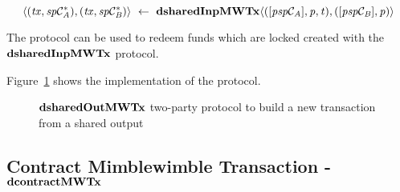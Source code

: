 \[ \langle (\mathit{tx}, \mathit{sp}\mathcal{C}_{\mathit{A}}^*), (\mathit{tx}, \mathit{sp}\mathcal{C}_{\mathit{B}}^*) \rangle ~\leftarrow~ \mathbf{dsharedInpMWTx} \langle([\mathit{psp}\mathcal{C}_{\mathit{A}}],\mathit{p},\mathit{t}), ([\mathit{psp}\mathcal{C}_{\mathit{B}}],\mathit{p}) \rangle \]

The protocol can be used to redeem funds which are locked created with the \\ $\mathbf{dsharedInpMWTx}$ protocol.

Figure~\cref{fig:d-shared-inp-mw-tx} shows the implementation of the protocol.

\begin{figure}
    \begin{center}
    \end{center}
    \caption{$\mathbf{dsharedOutMWTx}$ two-party protocol to build a new transaction from a shared output} \label{fig:d-shared-inp-mw-tx}
\end{figure}

\subsection{Contract Mimblewimble Transaction - $\mathbf{dcontractMWTx}$} \label{subsec:atom:script-mw-tx}

